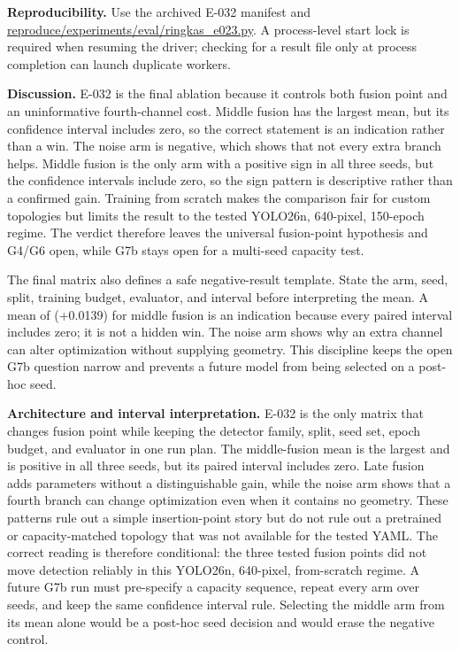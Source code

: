 \documentclass[preprint,12pt]{elsarticle}
\newcommand{\pathcode}[1]{\scriptsize\url{#1}}
\begin{document}
\textbf{Reproducibility.} Use the archived E-032 manifest and
\pathcode{reproduce/experiments/eval/ringkas_e023.py}. A process-level start lock is required when
resuming the driver; checking for a result file only at process completion can
launch duplicate workers.

\textbf{Discussion.} E-032 is the final ablation because it controls both
fusion point and an uninformative fourth-channel cost. Middle fusion has the
largest mean, but its confidence interval includes zero, so the correct
statement is an indication rather than a win. The noise arm is negative,
which shows that not every extra branch helps. Middle fusion is the only arm
with a positive sign in all three seeds, but the confidence intervals include
zero, so the sign pattern is descriptive rather than a confirmed gain.
Training from scratch makes the comparison fair for custom topologies but
limits the result to the tested YOLO26n, 640-pixel, 150-epoch regime. The
verdict therefore leaves the universal fusion-point hypothesis and G4/G6
open, while G7b stays open for a multi-seed capacity test.

The final matrix also defines a safe negative-result template. State the arm,
seed, split, training budget, evaluator, and interval before interpreting the
mean. A mean of (+0.0139) for middle fusion is an indication because every
paired interval includes zero; it is not a hidden win. The noise arm shows why
an extra channel can alter optimization without supplying geometry. This
discipline keeps the open G7b question narrow and prevents a future model from
being selected on a post-hoc seed.

\textbf{Architecture and interval interpretation.} E-032 is the only matrix
that changes fusion point while keeping the detector family, split, seed set,
epoch budget, and evaluator in one run plan. The middle-fusion mean is the
largest and is positive in all three seeds, but its paired interval includes
zero. Late fusion adds parameters without a distinguishable gain, while
the noise arm shows that a fourth branch can change optimization even when it
contains no geometry. These patterns rule out a simple insertion-point story
but do not rule out a pretrained or capacity-matched topology that was not
available for the tested YAML. The correct reading is therefore conditional:
the three tested fusion points did not move detection reliably in this
YOLO26n, 640-pixel, from-scratch regime. A future G7b run must pre-specify a
capacity sequence, repeat every arm over seeds, and keep the same confidence
interval rule. Selecting the middle arm from its mean alone would be a
post-hoc seed decision and would erase the negative control.
\end{document}
